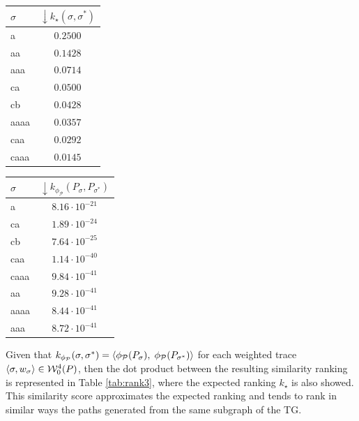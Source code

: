 \begin{table}[!t]
{\begin{tabular}{l|c}
	{$\sigma$} &
	{$\boldsymbol{\downarrow}k_\star(\sigma,\sigma^*)$} \\
	
	
	\midrule
	{a}  &  $0.2500$ \\
	{aa}  &  $0.1428$  \\
	{aaa}  & $0.0714$ \\
	{ca}  &   $0.0500$\\
	{cb}  & $0.0428$ \\
	{aaaa}  &  $0.0357$ \\
	{caa}  &  $0.0292$ \\
	{caaa}  &   $0.0145$ \\
	\bottomrule
\end{tabular}\quad	\begin{tabular}{l|c}
	\toprule
	
	{$\sigma$} &
	{$\boldsymbol{\downarrow}k_{\phi_{\mathcal{P}}}(P_\sigma,P_{\sigma^*})$} \\

	
	\midrule
	{a}  & $8.16\cdot 10^{-21}$ \\
	{ca}  &   $1.89\cdot 10^{-24}$\\
	{cb}  &   $7.64\cdot 10^{-25}$\\
	{caa}  &$1.14\cdot 10^{-40}$\\
	{caaa}  &  $9.84\cdot 10^{-41}$\\
	{aa}  &  $9.28\cdot 10^{-41}$ \\
	{aaaa}  & $8.44\cdot 10^{-41}$\\
	{aaa}  &  $8.72\cdot 10^{-41}$\\
	\bottomrule
\end{tabular}}
\end{table}




\begin{example}\label{ex:11}
	Given that $k_{\phi_{\mathcal{P}}}(\sigma,\sigma^*)=\braket{\phi_{\mathcal{P}}(P_\sigma),\;\phi_{\mathcal{P}}(P_{\sigma^*})}$ for each weighted trace $\braket{\sigma,w_\sigma}\in\mathcal{W}_0^4(P)$, then the dot product between the resulting similarity ranking is represented in Table \ref{tab:rank3}, where the expected ranking $k_\star$ is also showed. This similarity score approximates the expected ranking  and tends to rank in similar ways the paths generated from the same subgraph of the TG.
\end{example}



